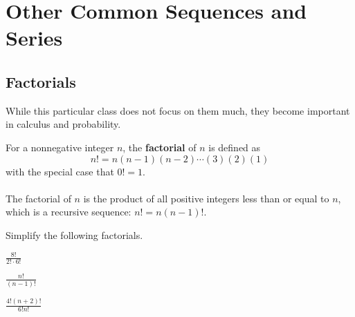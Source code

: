 \documentclass[addpoints]{exam}
\begin{document}
\section*{Other Common Sequences and Series}
\subsection*{Factorials}
While this particular class does not focus on them much, they become important in calculus and probability.

\begin{tcolorbox}[title=Definition: \textit{Factorial},title filled,colframe=black,sharpish corners,width=\linewidth]
    For a nonnegative integer $n$, the \textbf{factorial} of $n$ is defined as
    \[n! = n(n-1)(n-2)\cdots(3)(2)(1)\]
    with the special case that $0! = 1$.\\
    \\
    The factorial of $n$ is the product of all positive integers less than or equal to $n$, which is a recursive sequence: $n! = n(n-1)!$.
\end{tcolorbox}
\noindent Simplify the following factorials.
\begin{questions}
    \begin{minipage}{.3\linewidth}
        \question $\displaystyle\frac{8!}{2!\cdot6!}$
    \end{minipage}
    \hfill
    \begin{minipage}{.3\linewidth}
        \question $\displaystyle\frac{n!}{(n-1)!}$
    \end{minipage}
    \hfill
    \begin{minipage}{.3\linewidth}
        \question $\displaystyle\frac{4!(n+2)!}{6!n!}$
    \end{minipage}

\end{questions}
\end{document}
